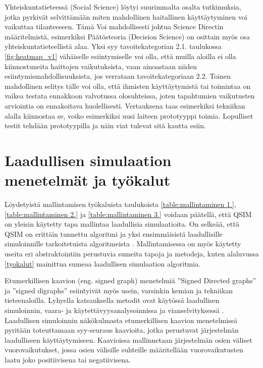 \documentclass[utf8]{gradu3}
\begin{document}
Yhteiskuntatieteessä (Social Science) löytyi suurimmalta osalta tutkimuksia, 
jotka pyrkivät selvittämään miten mahdollinen haitallinen käyttäytyminen voi vaikuttaa
tilanteeseen. Tämä Voi mahdollisesti johtua Science Directin määritelmistä, esimerkiksi
Päätösteoria (Decision Science) on osittain myös osa yhteiskuntatieteellistä alaa. 
Yksi syy tavoitekategorian 2.1. taulukossa \ref{fig:heatmap_v1}
vähäiselle esiintymiselle voi olla, 
että muilla aloilla ei olla kiinnostuneita haittojen vaikutuksista,
vaan ainoastaan niiden esiintymismahdollisuuksista, 
jos verrataan tavoitekategoriaan 2.2.
Toinen mahdollinen selitys tälle voi olla, 
että ihmisten käyttäytymistä tai toimintaa on vaikea testata ennakkoon valvotussa olosuhteissa, 
joten tapahtumien vaikutusten arviointia on ennakoitava huolellisesti.
Vertauksena taas esimerkiksi tekniikan alalla kiinnostaa se, 
voiko esimerkiksi uusi laiteen prototyyppi toimia. 
Lopulliset testit tehdään prototyypilla ja näin viat tulevat sitä kautta esiin.

\section{Laadullisen simulaation menetelmät ja työkalut}
Löydetyistä mallintamisen työkaluista taulukoista \ref{table:mallintaminen 1.},
\ref{table:mallintaminen 2.} ja \ref{table:mallintaminen 3.} voidaan päätellä, 
että QSIM on yleisin käytetty tapa mallintaa laadullisia simulaatioita.
On selkeää, että QSIM on erittäin tunnettu algoritmi ja yksi ensimmäisistä
laadullisille simuloinnille tarkoitetuista algoritmeista
\parencite{kuipers1986qualitative}.
Mallintamisessa on myös käytetty useita eri abstraktointiin perustuvia sumeita tapoja ja metodeja, kuten alaluvussa \ref{tyokalut} mainittua sumeaa laadullisen simulaation algoritmia.

Etumerkillisen kaavion (eng. signed graph) menetelmiä 
''Signed Directed graphs'' ja ''signed digraphs'' 
esiintyivät myös usein, 
varsinkin kemian ja tekniikan tieteenaloilla. Lyhyella katsauksella
metodit ovat käytössä laadullisen simuloinnin, vaara- ja käytettävyysanalysoinnissa 
ja vianselvityksessä \parencite{SDGapplication2004}.
Laadullisen simuloinnin näkökulmasta etumerkillisen kaavion 
menetelmissä pyritään toteuttamaan syy-seuraus kaavioita, 
jotka perustuvat järjestelmän laadulliseen käyttäytymiseen. 
Kaavioissa mallinnetaan järjestelmän osien väliset vuorovaikutukset, 
jossa osien välisille suhteille 
määritellään vuorovaikutusten laatu joko positiivisena tai negatiivisena.
\end{document}
